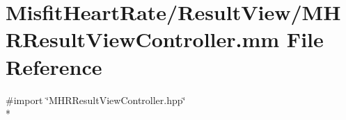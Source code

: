 \hypertarget{_m_h_r_result_view_controller_8mm}{\section{Misfit\+Heart\+Rate/\+Result\+View/\+M\+H\+R\+Result\+View\+Controller.mm File Reference}
\label{_m_h_r_result_view_controller_8mm}
}
{\ttfamily \#import \char`\"{}M\+H\+R\+Result\+View\+Controller.\+hpp\char`\"{}}\\*
